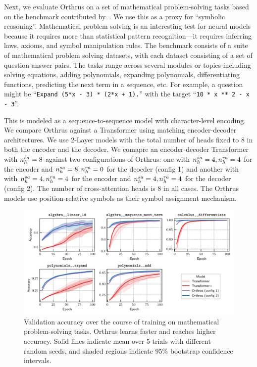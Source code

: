 Next, we evaluate Orthrus on a set of mathematical problem-solving tasks based on the benchmark contributed by~\citet{saxtonAnalyzingMathematicalReasoning2019}. We use this as a proxy for ``symbolic reasoning''. Mathematical problem solving is an interesting test for neural models because it requires more than statistical pattern recognition---it requires inferring laws, axioms, and symbol manipulation rules. The benchmark consists of a suite of mathematical problem solving datasets, with each dataset consisting of a set of question-answer pairs. The tasks range across several modules or topics including solving equations, adding polynomials, expanding polynomials, differentiating functions, predicting the next term in a sequence, etc. For example, a question might be ``\texttt{Expand (5*x - 3) * (2*x + 1).}'' with the target ``\texttt{10 * x ** 2 - x - 3}''.

This is modeled as a sequence-to-sequence model with character-level encoding. We compare Orthrus against a Transformer using matching encoder-decoder architectures. We use 2-Layer models with the total number of heads fixed to $8$ in both the encoder and the decoder. We comapre an encoder-decoder Transformer with $n_h^{sa} = 8$ against two configurations of Orthrus: one with $n_h^{sa} = 4, n_h^{ra} = 4$ for the encoder and $n_h^{sa} = 8, n_h^{ra} = 0$ for the deocder (config 1) and another with with $n_h^{sa} = 4, n_h^{ra} = 4$ for the encoder and $n_h^{sa} = 4, n_h^{ra} = 4$ for the decoder (config 2). The number of cross-attention heads is $8$ in all cases. The Orthrus models use position-relative symbols as their symbol assignment mechanism.

\begin{figure}
    \includegraphics[width=\textwidth]{figs/experiments/math/math_training_curves_interpolation.pdf}
    \caption{Validation accuracy over the course of training on mathematical problem-solving tasks. Orthrus learns faster and reaches higher accuracy. Solid lines indicate mean over 5 trials with different random seeds, and shaded regions indicate 95\% bootstrap confidence intervals.}\label{fig:math_training_curves_interpolation}
\end{figure}

